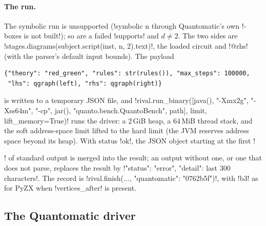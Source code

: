 \paragraph{The run.} The symbolic run is unsupported (\code!symbolic n through Quantomatic's own !-boxes is not built!); so are a failed \py!supports! and $d\neq2$. The two sides are \py!stages.diagrams(subject.script(inst, n, 2).text)!, the loaded circuit and \azx!@rhs! (with the parser's default input bounds). The payload
\begin{lstlisting}[style=python]
{"theory": "red_green", "rules": str(rules()), "max_steps": 100000,
 "lhs": qgraph(left), "rhs": qgraph(right)}
\end{lstlisting}
is written to a temporary JSON file, and \py!rival.run_binary([java(), "-Xmx2g", "-Xss64m", "-cp", jar(), "quanto.bench.QuantoBench", path], limit, lift_memory=True)! runs the driver: a $2$\,GiB heap, a $64$\,MiB thread stack, and the soft address-space limit lifted to the hard limit (the JVM reserves address space beyond its heap). With status \code!ok!, the JSON object starting at the first \code!{! of standard output is merged into the result; an output without one, or one that does not parse, replaces the result by \py!{"status": "error", "detail": last 300 characters}!. The record is \py!rival.finish(..., {"quantomatic": "0762b5f"})!, with \code!b3! as for PyZX when \code!vertices_after! is present.

\subsection{The Quantomatic driver}

}
